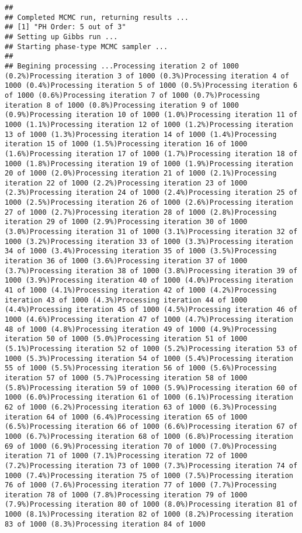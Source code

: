 \documentclass[
]{article}
\begin{document}
\begin{verbatim}
## 
## Completed MCMC run, returning results ...
## [1] "PH Order: 5 out of 3"
## Setting up Gibbs run ...
## Starting phase-type MCMC sampler ...
## 
## Begining processing ...Processing iteration 2 of 1000 (0.2%)Processing iteration 3 of 1000 (0.3%)Processing iteration 4 of 1000 (0.4%)Processing iteration 5 of 1000 (0.5%)Processing iteration 6 of 1000 (0.6%)Processing iteration 7 of 1000 (0.7%)Processing iteration 8 of 1000 (0.8%)Processing iteration 9 of 1000 (0.9%)Processing iteration 10 of 1000 (1.0%)Processing iteration 11 of 1000 (1.1%)Processing iteration 12 of 1000 (1.2%)Processing iteration 13 of 1000 (1.3%)Processing iteration 14 of 1000 (1.4%)Processing iteration 15 of 1000 (1.5%)Processing iteration 16 of 1000 (1.6%)Processing iteration 17 of 1000 (1.7%)Processing iteration 18 of 1000 (1.8%)Processing iteration 19 of 1000 (1.9%)Processing iteration 20 of 1000 (2.0%)Processing iteration 21 of 1000 (2.1%)Processing iteration 22 of 1000 (2.2%)Processing iteration 23 of 1000 (2.3%)Processing iteration 24 of 1000 (2.4%)Processing iteration 25 of 1000 (2.5%)Processing iteration 26 of 1000 (2.6%)Processing iteration 27 of 1000 (2.7%)Processing iteration 28 of 1000 (2.8%)Processing iteration 29 of 1000 (2.9%)Processing iteration 30 of 1000 (3.0%)Processing iteration 31 of 1000 (3.1%)Processing iteration 32 of 1000 (3.2%)Processing iteration 33 of 1000 (3.3%)Processing iteration 34 of 1000 (3.4%)Processing iteration 35 of 1000 (3.5%)Processing iteration 36 of 1000 (3.6%)Processing iteration 37 of 1000 (3.7%)Processing iteration 38 of 1000 (3.8%)Processing iteration 39 of 1000 (3.9%)Processing iteration 40 of 1000 (4.0%)Processing iteration 41 of 1000 (4.1%)Processing iteration 42 of 1000 (4.2%)Processing iteration 43 of 1000 (4.3%)Processing iteration 44 of 1000 (4.4%)Processing iteration 45 of 1000 (4.5%)Processing iteration 46 of 1000 (4.6%)Processing iteration 47 of 1000 (4.7%)Processing iteration 48 of 1000 (4.8%)Processing iteration 49 of 1000 (4.9%)Processing iteration 50 of 1000 (5.0%)Processing iteration 51 of 1000 (5.1%)Processing iteration 52 of 1000 (5.2%)Processing iteration 53 of 1000 (5.3%)Processing iteration 54 of 1000 (5.4%)Processing iteration 55 of 1000 (5.5%)Processing iteration 56 of 1000 (5.6%)Processing iteration 57 of 1000 (5.7%)Processing iteration 58 of 1000 (5.8%)Processing iteration 59 of 1000 (5.9%)Processing iteration 60 of 1000 (6.0%)Processing iteration 61 of 1000 (6.1%)Processing iteration 62 of 1000 (6.2%)Processing iteration 63 of 1000 (6.3%)Processing iteration 64 of 1000 (6.4%)Processing iteration 65 of 1000 (6.5%)Processing iteration 66 of 1000 (6.6%)Processing iteration 67 of 1000 (6.7%)Processing iteration 68 of 1000 (6.8%)Processing iteration 69 of 1000 (6.9%)Processing iteration 70 of 1000 (7.0%)Processing iteration 71 of 1000 (7.1%)Processing iteration 72 of 1000 (7.2%)Processing iteration 73 of 1000 (7.3%)Processing iteration 74 of 1000 (7.4%)Processing iteration 75 of 1000 (7.5%)Processing iteration 76 of 1000 (7.6%)Processing iteration 77 of 1000 (7.7%)Processing iteration 78 of 1000 (7.8%)Processing iteration 79 of 1000 (7.9%)Processing iteration 80 of 1000 (8.0%)Processing iteration 81 of 1000 (8.1%)Processing iteration 82 of 1000 (8.2%)Processing iteration 83 of 1000 (8.3%)Processing iteration 84 of 1000 
\end{verbatim}
\end{document}

